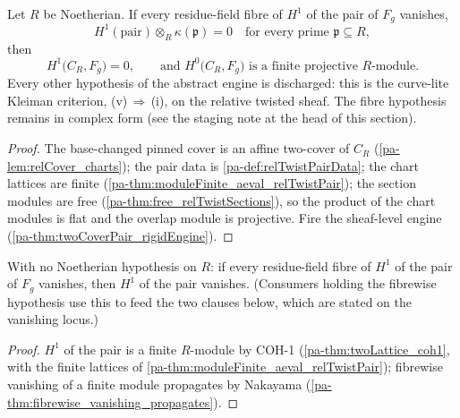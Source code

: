 \begin{theorem}
  \label{pa-thm:relTwistRigidEngine}
  \leanok

  Let \(R\) be Noetherian. If every residue-field fibre of \(H^1\) of the pair of
  \(F_g\) vanishes,
  \[
    H^1(\text{pair}) \otimes_R \kappa(\mathfrak p) = 0 \quad \text{for every prime }
      \mathfrak p \subseteq R,
  \]
  then
  \[
    H^1\bigl(C_R, F_g\bigr) = 0, \qquad \text{and } H^0\bigl(C_R, F_g\bigr)
      \text{ is a finite projective } R\text{-module}.
  \]
  Every other hypothesis of the abstract engine is discharged: this is the curve-lite
  Kleiman criterion, (v)\,\(\Rightarrow\)\,(i), on the relative twisted sheaf. The
  fibre hypothesis remains in complex form (see the staging note at the head of this
  section).
\end{theorem}
\begin{proof}
  \leanok
  The base-changed pinned cover is an affine two-cover of \(C_R\)
  (\ref{pa-lem:relCover_charts}); the pair data is \ref{pa-def:relTwistPairData}; the chart
  lattices are finite (\ref{pa-thm:moduleFinite_aeval_relTwistPair}); the section modules
  are free (\ref{pa-thm:free_relTwistSections}), so the product of the chart modules is
  flat and the overlap module is projective. Fire the sheaf-level engine
  (\ref{pa-thm:twoCoverPair_rigidEngine}).
\end{proof}

\begin{lemma}
  \label{pa-lem:relTwist_subsingleton_pairH1}
  \leanok

  With no Noetherian hypothesis on \(R\): if every residue-field fibre of \(H^1\) of
  the pair of \(F_g\) vanishes, then \(H^1\) of the pair vanishes. (Consumers holding
  the fibrewise hypothesis use this to feed the two clauses below, which are stated on
  the vanishing locus.)
\end{lemma}
\begin{proof}
  \leanok
  \(H^1\) of the pair is a finite \(R\)-module by COH-1
  (\ref{pa-thm:twoLattice_coh1}, with the finite lattices of
  \ref{pa-thm:moduleFinite_aeval_relTwistPair}); fibrewise vanishing of a finite module
  propagates by Nakayama (\ref{pa-thm:fibrewise_vanishing_propagates}).
\end{proof}

